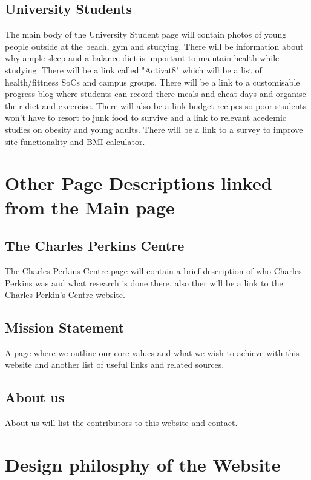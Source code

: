 \documentclass[letterpaper,12pt]{article}
\begin{document}
\subsection{University Students}

The main body of the University Student page will contain photos of young people outside at the beach, gym and studying. There will be information about why ample sleep and a balance diet is important to maintain health while studying. There will be a link called "Activat8" which will be a list of health/fittness SoCs and campus groups. There will be a link to a customisable progress blog where students can record there meals and cheat days and organise their diet and excercise. There will also be a link budget recipes so poor students won't have to resort to junk food to survive and a link to relevant acedemic studies on obesity and young adults. There will be a link to a survey to improve site functionality and BMI calculator.

\section{Other Page Descriptions linked from the Main page}

\subsection{The Charles Perkins Centre}

The Charles Perkins Centre page will contain a brief description of who Charles Perkins was and what research is done there, also ther will be a link to the Charles Perkin's Centre website.

\subsection{Mission Statement} 

A page where we outline our core values and what we wish to achieve with this website and another list of useful links and related sources.


\subsection{About us}

About us will list the contributors to this website and contact.

\section{Design philosphy of the Website}
\end{document}
